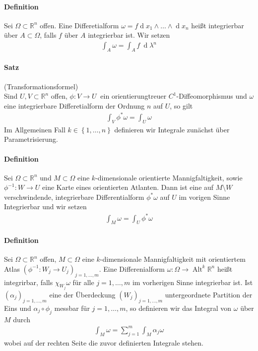 \documentclass[12pt,a4paper,fleqn]{article}
\def\set#1{{\left\{ #1 \right\}}}
\def\R{{\mathbb{R}}}
\def\d{{\operatorname{d}}}
\begin{document}
\paragraph{Definition} Sei $\Omega\subset \R^n$ offen. Eine Differetialform $\omega= f\d x_1\wedge\dotsc\wedge\d x_n$ heißt integrierbar über $A\subset\Omega$, falls $f$ über $A$ integrierbar ist. Wir setzen
\begin{align*}
\int_A \omega = \int_A f\ \d\lambda^n
\end{align*}

\paragraph{Satz} (Transformationsformel)\\
Sind $U, V\subset \R^n$ offen, $\phi\colon V \rightarrow U\ $ ein orientierungtreuer $C^1$-Diffeomorphismus und $\omega$ eine integrierbare Differetialform der Ordnung $n$ auf $U$, so gilt
\begin{align*}
\int_V \phi^\ast\omega = \int_U \omega
\end{align*}
Im Allgemeinen Fall $k \in \set{1, \dotsc, n}$ definieren wir Integrale zunächst über Parametrisierung.

\paragraph{Definition} Sei $\Omega\subset\R^n$ und $M\subset\Omega$ eine $k$-dimensionale orientierte Mannigfaltigkeit, sowie $\phi^{-1}\colon W \rightarrow U$ eine Karte eines orientierten Atlanten. Dann ist eine auf $M\setminus W$ verschwindende, integrierbare Differentialform $\phi^\ast\omega$ auf $U$ im vorigen Sinne Integrierbar und wir setzen
\begin{align*}
\int_M \omega = \int_U \phi^\ast\omega
\end{align*}

\paragraph{Definition} Sei $\Omega\subset\R^n$ offen, $M\subset\Omega$ eine $k$-dimensionale Mannigfaltigkeit mit orientiertem Atlas $(\phi^{-1}\colon W_j \rightarrow U_j)_{j = 1, \dotsc, m}$. Eine Differenialform $\omega\colon \Omega \rightarrow\operatorname{Alt}^k \R^n$ heißt integrirbar, falls $\chi_{W_j}\omega$ für alle $j=1, \dotsc, m$ im vorherigen Sinne integrierbar ist. Ist $(\alpha_j)_{j=1, \dotsc, m}$ eine der Überdeckung $(W_j)_{j=1, \dotsc, m}$ untergeordnete Partition der Eins und $\alpha_j\circ\phi_j$ messbar für $j=1, \dotsc, m$, so definieren wir das Integral von $\omega$ über $M$ durch
\begin{align*}
\int_M \omega = \sum_{j=1}^m \int_M \alpha_j\omega
\end{align*}
wobei auf der rechten Seite die zuvor definierten Integrale stehen.
\end{document}
